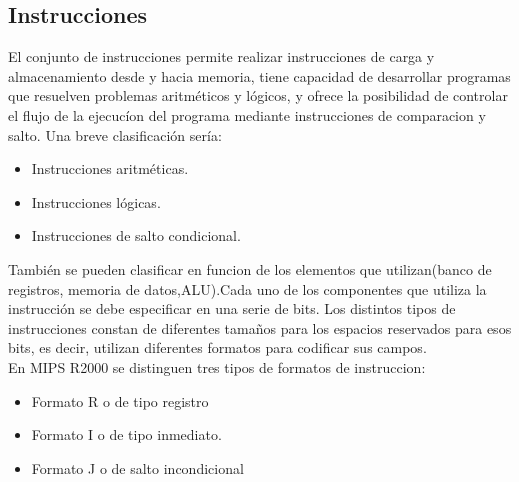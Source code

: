\documentclass[12pt]{article}
\begin{document}
\subsection{Instrucciones}
El conjunto de instrucciones permite realizar instrucciones de carga y almacenamiento
desde y hacia memoria, tiene capacidad de desarrollar programas que resuelven problemas aritméticos y lógicos, y ofrece la posibilidad de controlar el flujo de la ejecucíon del programa mediante instrucciones de comparacion y salto.
Una breve clasificación sería:
\begin{itemize}
\item Instrucciones aritméticas.
\item Instrucciones lógicas.
\item Instrucciones de salto condicional.
\end{itemize}
También se pueden clasificar en funcion de los elementos que utilizan(banco de registros, memoria de datos,ALU).Cada uno de los componentes que utiliza la instrucción se debe especificar en una serie de bits. Los distintos tipos de instrucciones
constan de diferentes tamaños para los espacios reservados para esos bits, es decir, utilizan diferentes formatos para codificar sus campos.\\
En MIPS R2000 se distinguen tres tipos de formatos de instruccion:
\begin{itemize}
\item Formato R o de tipo registro
\item Formato I o de tipo inmediato.
\item Formato J o de salto incondicional
\end{itemize}

\end{document}
